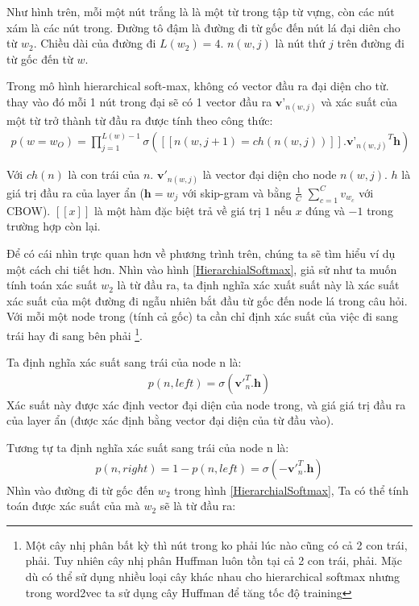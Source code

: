 Như hình trên, mỗi một nút trắng là là một từ trong tập từ vựng, còn các nút xám là các nút trong. Đường tô đậm là đường đi từ gốc đến nút lá đại diên cho từ $w_2$. Chiều dài của đường đi $L(w_2)=4$. $n(w,j)$ là nút thứ $j$ trên đường đi từ gốc đến từ $w$.

Trong mô hình hierarchical soft-max, không có vector đầu ra đại diện cho từ. thay vào đó mỗi 1 nút trong đại sẽ có 1 vector đầu ra $\textbf{v'}_{n(w,j)}$ và xác suất của một từ trở thành từ đầu ra được tính theo công thức:
\begin{eqnarray}
p(w=w_O)= \prod^{L(w)-1}_{j=1}\sigma\left( \left[  \left[ n(w,j+1)=ch(n(w,j)) \right]  \right] . {\textbf{v'}_{n(w,j)}}^{T} \textbf{h} \right) 
\end{eqnarray}

Với $ch(n)$ là con trái của $n$. $\textbf{v}'_{n(w,j)}$ là vector đại diện cho node $n(w,j)$. $h$ là giá trị đầu ra của layer ẩn ($\textbf{h}=w_j$ với skip-gram và bằng $\frac{1}{C}$ $\sum^{C}_{c=1} v_{w_c}$ với CBOW). $[[x]]$ là một hàm đặc biệt trả về giá trị $1$ nếu $x$ đúng và $-1$ trong trường hợp còn lại.

Để có cái nhìn trực quan hơn về phương trình trên, chúng ta sẽ tìm hiểu ví dụ một cách chi tiết hơn. Nhìn vào hình {\ref{HierarchialSoftmax}}, giả sử như ta muốn tính toán xác suất $w_2$ là từ đầu ra, ta định nghĩa xác xuất suất này là xác suất xác suất của một đường đi ngẫu nhiên bắt đầu từ gốc đến node lá trong câu hỏi. Với mỗi một node trong (tính cả gốc) ta cần chỉ định xác suất của việc đi sang trái hay đi sang bên phải \footnote{Một cây nhị phân bất kỳ thì nút trong ko phải lúc nào cũng có cả 2 con trái, phải. Tuy nhiên cây nhị phân Huffman luôn tồn tại cả 2 con trái, phải. Mặc dù có thể sử dụng nhiều loại cây khác nhau cho  hierarchical softmax nhưng trong word2vec ta sử dụng cây Huffman để tăng tốc độ training}.

Ta định nghĩa xác suất sang trái của node n là:
\begin{eqnarray}
p(n,left)= \sigma\left( \textbf{v}'^{T}_{n} . \textbf{h} \right) 
\end{eqnarray}
Xác suất này được xác định vector đại diện của node trong, và giá giá trị đầu ra của layer ẩn (được xác định bằng vector đại diện của từ đầu vào).

Tương tự ta định nghĩa xác suất sang trái của node n là:
\begin{eqnarray}
p(n,right)= 1 - p(n,left) = \sigma\left( -\textbf{v}'^{T}_{n} . \textbf{h}\right) 
\end{eqnarray}
Nhìn vào đường đi từ gốc đến $w_2$ trong hình \ref{HierarchialSoftmax}, Ta có thể tính toán được xác suất của mà $w_2$ sẽ là từ đầu ra:

